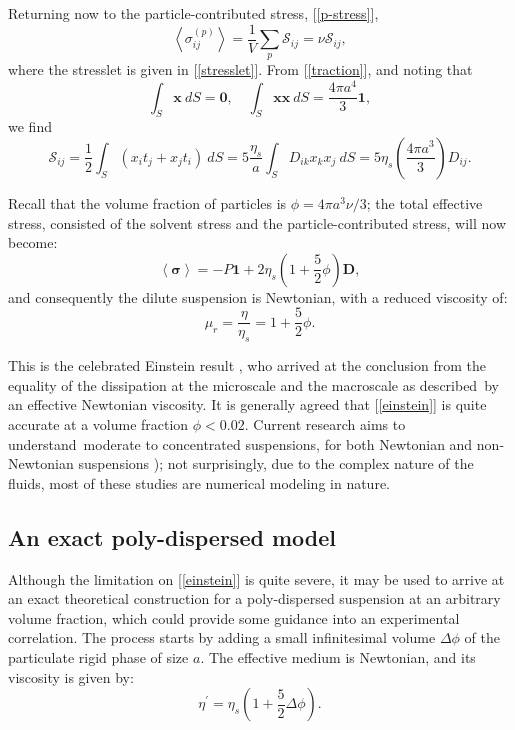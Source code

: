 \documentclass[english,fleqn,allpages]{ISTE_science}[2018/07/30]
\begin{document}
Returning now to the particle-contributed stress, [\ref{p-stress}],
\[
\left\langle \sigma_{ij}^{(p)}\right\rangle =\frac{1}{V}\sum_{p}\mathcal{S}_{ij}=\nu\mathcal{S}_{ij},
\]
where the stresslet is given in [\ref{stresslet}]. From [\ref{traction}],
and noting that
\[
\int_{S}\mathbf{x}\ dS=\mathbf{0},\quad\int_{S}\mathbf{xx}\ dS=\frac{4\pi a^{4}}{3}\mathbf{1},
\]
we find 
\[
\mathcal{S}_{ij}=\frac{1}{2}\int_{S}\left(x_{i}t_{j}+x_{j}t_{i}\right)\ dS=5\frac{\eta_{s}}{a}\int_{S}D_{ik}x_{k}x_{j}\ dS=5\eta_{s}\left(\frac{4\pi a^{3}}{3}\right)D_{ij}.
\]

Recall that the volume fraction of particles is $\phi=4\pi a^{3}\nu/3$;
the total effective stress, consisted of the solvent stress and the
particle-contributed stress, will now become: 
\begin{equation}
\left\langle \mathbf{\sigma}\right\rangle =-P\mathbf{1}+2\eta_{s}\left(1+\frac{5}{2}\phi\right)\mathbf{D},
\end{equation}
and consequently the dilute suspension is Newtonian, with a reduced
viscosity of:
\begin{equation}
\mu_{r}=\frac{\eta}{\eta_{s}}=1+\frac{5}{2}\phi.\label{einstein}
\end{equation}

This is the celebrated Einstein result \cite{einstein03}, who
arrived at the conclusion from the equality of the dissipation at
the microscale and the macroscale as described~by an effective Newtonian
viscosity. It is generally agreed that [\ref{einstein}] is quite
accurate at a volume fraction $\phi<0.02.$ Current research aims to
understand~moderate to concentrated suspensions, for both Newtonian
\cite{foss00, zarraga00, Pan10, dai13, phanthien14b}
and non-Newtonian suspensions \cite{lyon01, zarraga01, gleissle02,
tanner10}); not surprisingly, due to the complex nature of
the fluids, most of these studies are numerical modeling in nature.


\subsection{An exact poly-dispersed model}

Although the limitation on [\ref{einstein}] is quite severe,
it may be used to arrive at an exact theoretical construction for
a poly-dispersed suspension at an arbitrary volume fraction, which
could provide some guidance into an experimental correlation. The
process starts by adding a small infinitesimal volume $\Delta\phi$
of the particulate rigid phase of size $a.$ The effective medium
is Newtonian, and its viscosity is given by:
\begin{equation}
\eta^{\prime}=\eta_{s}\left(1+\frac{5}{2}\Delta\phi\right).
\end{equation}
\end{document}
